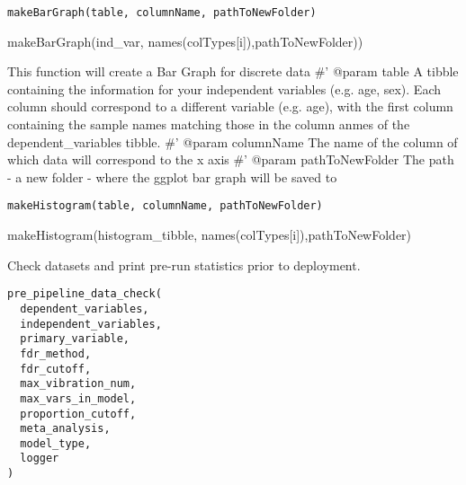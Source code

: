 \documentclass[a4paper]{book}
\begin{document}
%
\begin{Usage}
\begin{verbatim}
makeBarGraph(table, columnName, pathToNewFolder)
\end{verbatim}
\end{Usage}
%
\begin{Examples}
\begin{ExampleCode}
makeBarGraph(ind_var, names(colTypes[i]),pathToNewFolder))
\end{ExampleCode}
\end{Examples}
%
\begin{Description}\relax
This function will create a Bar Graph for discrete data 
\#' @param table A tibble containing the information for your independent variables (e.g. age, sex). Each column should correspond to a different variable (e.g. age), with the first column containing the sample names matching those in the column anmes of the dependent\_variables tibble.
\#' @param columnName The name of the column of which data will correspond to the x axis 
\#' @param pathToNewFolder The path - a new folder - where the ggplot bar graph will be saved to
\end{Description}
%
\begin{Usage}
\begin{verbatim}
makeHistogram(table, columnName, pathToNewFolder)
\end{verbatim}
\end{Usage}
%
\begin{Examples}
\begin{ExampleCode}
makeHistogram(histogram_tibble, names(colTypes[i]),pathToNewFolder)
\end{ExampleCode}
\end{Examples}
%
\begin{Description}\relax
Check datasets and print pre-run statistics prior to deployment.
\end{Description}
%
\begin{Usage}
\begin{verbatim}
pre_pipeline_data_check(
  dependent_variables,
  independent_variables,
  primary_variable,
  fdr_method,
  fdr_cutoff,
  max_vibration_num,
  max_vars_in_model,
  proportion_cutoff,
  meta_analysis,
  model_type,
  logger
)
\end{verbatim}
\end{Usage}
\end{document}

